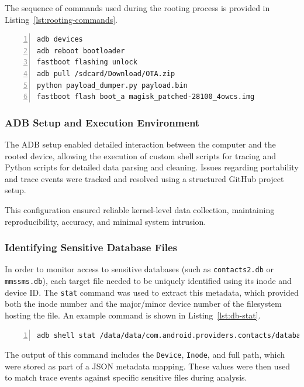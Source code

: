 \documentclass[a4paper,12pt]{report}
\begin{document}
The sequence of commands used during the rooting process is provided in Listing~\ref{lst:rooting-commands}.

\begin{lstlisting}[language=bash,caption={Rooting commands for device setup},label={lst:rooting-commands},numbers=left]
adb devices
adb reboot bootloader
fastboot flashing unlock
adb pull /sdcard/Download/OTA.zip
python payload_dumper.py payload.bin
fastboot flash boot_a magisk_patched-28100_4owcs.img
\end{lstlisting}

\subsubsection{ADB Setup and Execution Environment}

The ADB setup enabled detailed interaction between the computer and the rooted device, allowing the execution of custom shell scripts for tracing and Python scripts for detailed data parsing and cleaning. Issues regarding portability and trace events were tracked and resolved using a structured GitHub project setup.

This configuration ensured reliable kernel-level data collection, maintaining reproducibility, accuracy, and minimal system intrusion.

\subsubsection{Identifying Sensitive Database Files}

In order to monitor access to sensitive databases (such as \texttt{contacts2.db} or \texttt{mmssms.db}), each target file needed to be uniquely identified using its inode and device ID. The \texttt{stat} command was used to extract this metadata, which provided both the inode number and the major/minor device number of the filesystem hosting the file. An example command is shown in Listing~\ref{lst:db-stat}.

\begin{lstlisting}[language=sh,caption={Retrieving inode and device ID for a database file},label={lst:db-stat},numbers=left]
adb shell stat /data/data/com.android.providers.contacts/databases/contacts2.db
\end{lstlisting}

The output of this command includes the \texttt{Device}, \texttt{Inode}, and full path, which were stored as part of a JSON metadata mapping. These values were then used to match trace events against specific sensitive files during analysis.
\end{document}
